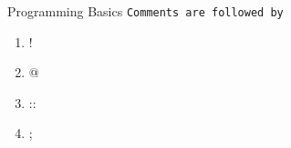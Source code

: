 \documentclass{beamer}
\begin{document}
\begin{frame}{Programming Basics}
    \texttt{Comments are followed by \underline{\hspace{2cm}}}
    \begin{enumerate}
        \item<1> !
        \item<1> @
        \item<1> ::
        \item<1-2> ;
    \end{enumerate}
\end{frame}
\end{document}
